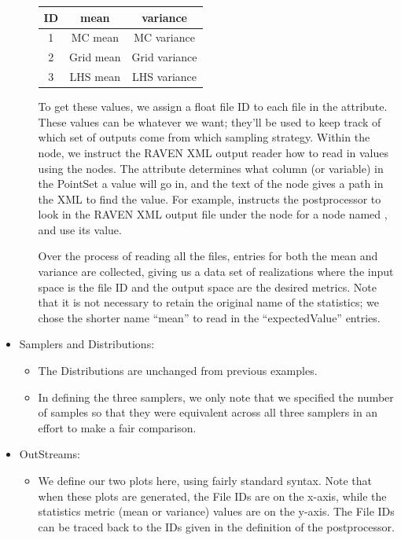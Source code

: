 \begin{itemize}
\begin{itemize}
\begin{center}
\begin{tabular}{c | c | c }
          ID & mean & variance \\ \hline
          1 & MC mean & MC variance \\
          2 & Grid mean & Grid variance \\
          3 & LHS mean & LHS variance
        \end{tabular}
        \end{center}
        To get these values, we assign a float file ID to each file in the  attribute.  These
        values can be whatever we want; they'll be used to keep track of which set of outputs come from which
        sampling strategy.  Within the  node, we instruct the RAVEN XML output reader how to
        read in values using the  nodes.  The  attribute determines what column
        (or variable) in the PointSet a value will go in, and the text of the node gives a path in the XML to
        find the value.  For example,  instructs the postprocessor to look in the RAVEN
        XML output file under the node  for a node named , and use its
        value.

        Over the process of reading all the files, entries for both the mean and variance are collected,
        giving us a data set of realizations where the input space is the file ID and the output space are the
        desired metrics.  Note that it is not necessary to retain the original name of the statistics; we
        chose the shorter name ``mean'' to read in the ``expectedValue'' entries.
    \end{itemize}
  \item Samplers and Distributions:
    \begin{itemize}
      \item The Distributions are unchanged from previous examples.
      \item In defining the three samplers, we only note that we specified the number of samples so that they
        were equivalent across all three samplers in an effort to make a fair comparison.
    \end{itemize}
  \item OutStreams:
    \begin{itemize}
      \item We define our two plots here, using fairly standard syntax.  Note that when these plots are
        generated, the File IDs are on the x-axis, while the statistics metric (mean or variance) values are
        on the y-axis.  The File IDs can be traced back to the IDs given in the definition of the
         postprocessor.
    \end{itemize}
\end{itemize}
